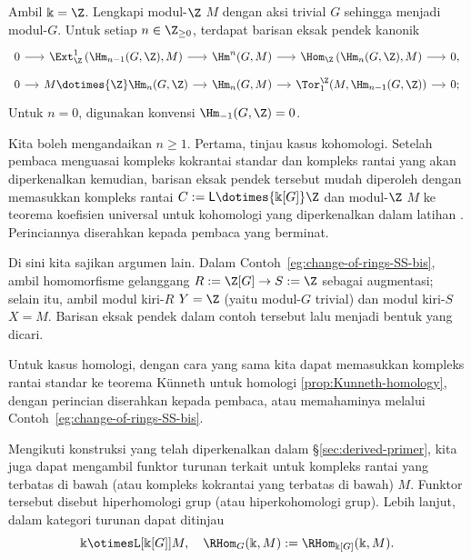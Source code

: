 \begin{proposisi}\label{prop:group-UCT}
	Ambil $\Bbbk=\Z$. Lengkapi modul-$\Z$ $M$ dengan aksi trivial $G$ sehingga
	menjadi modul-$G$. Untuk setiap $n\in\Z_{\geq0}$, terdapat barisan eksak pendek
	kanonik
	\[\begin{tikzcd}[row sep=tiny, column sep=small]
		0 \arrow[r] & \Ext^1_{\Z}\left( \Hm_{n-1}(G, \Z), M \right) \arrow[r] & \Hm^n(G, M) \arrow[r] & \Hom_{\Z}\left( \Hm_n(G, \Z), M \right) \arrow[r] & 0, \\
		0 \arrow[r] & M \dotimes{\Z} \Hm_n(G, \Z) \arrow[r] & \Hm_n(G, M) \arrow[r] & \Tor^{\Z}_1(M, \Hm_{n-1}(G, \Z)) \arrow[r] & 0;
	\end{tikzcd}\]
	Untuk $n=0$, digunakan konvensi $\Hm_{-1}(G,\Z)=0$.
\end{proposisi}
\begin{bukti}
	Kita boleh mengandaikan $n\geq1$. Pertama, tinjau kasus kohomologi. Setelah
	pembaca menguasai kompleks kokrantai standar dan kompleks rantai yang akan
	diperkenalkan kemudian, barisan eksak pendek tersebut mudah diperoleh
	dengan memasukkan kompleks rantai
	$C:=\mathsf{L}\dotimes{\Bbbk[G]}\Z$ dan modul-$\Z$ $M$ ke teorema
	koefisien universal untuk kohomologi yang diperkenalkan dalam latihan
	. Perinciannya diserahkan kepada pembaca yang berminat.
	
	Di sini kita sajikan argumen lain. Dalam
	Contoh~\ref{eg:change-of-rings-SS-bis}, ambil homomorfisme gelanggang
	$R:=\Z[G]\to S:=\Z$ sebagai augmentasi; selain itu, ambil modul kiri-$R$
	$Y=\Z$ (yaitu modul-$G$ trivial) dan modul kiri-$S$ $X=M$. Barisan eksak
	pendek dalam contoh tersebut lalu menjadi bentuk yang dicari.
	
	Untuk kasus homologi, dengan cara yang sama kita dapat memasukkan kompleks
	rantai standar ke teorema Künneth untuk homologi
	\ref{prop:Kunneth-homology}, dengan perincian diserahkan kepada pembaca,
	atau memahaminya melalui Contoh~\ref{eg:change-of-rings-SS-bis}.
\end{bukti}

Mengikuti konstruksi yang telah diperkenalkan dalam
\S\ref{sec:derived-primer}, kita juga dapat mengambil funktor turunan terkait
untuk kompleks rantai yang terbatas di bawah (atau kompleks kokrantai yang
terbatas di bawah) $M$. Funktor tersebut disebut hiperhomologi grup (atau
hiperkohomologi grup). Lebih lanjut, dalam kategori turunan dapat ditinjau
\[ \Bbbk \otimesL[{\Bbbk[G]}] M, \quad \RHom_G(\Bbbk, M) := \RHom_{\Bbbk[G]}(\Bbbk, M). \]

